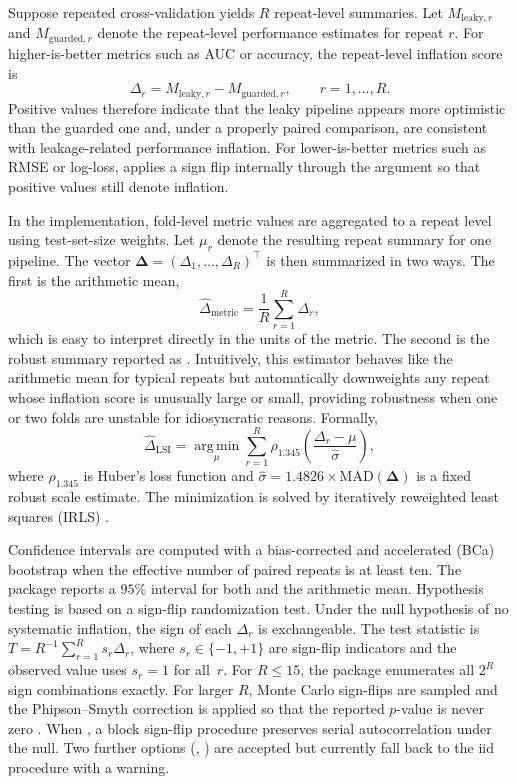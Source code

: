 \documentclass[article,shortnames]{jss}
\begin{document}
Suppose repeated cross-validation yields $R$ repeat-level summaries. Let
$M_{\mathrm{leaky},r}$ and $M_{\mathrm{guarded},r}$ denote the repeat-level
performance estimates for repeat $r$. For higher-is-better metrics such as AUC
or accuracy, the repeat-level inflation score is
\[
\Delta_r = M_{\mathrm{leaky},r} - M_{\mathrm{guarded},r}, \qquad r = 1, \ldots, R.
\]
Positive values therefore indicate that the leaky pipeline appears more optimistic than the guarded one and, under a properly paired comparison, are consistent with leakage-related performance inflation. For lower-is-better metrics such as RMSE or log-loss,  applies a sign flip internally through
the  argument so that positive values still denote
inflation.

In the implementation, fold-level metric values are aggregated to a repeat
level using test-set-size weights. Let $\mu_r$ denote the resulting repeat
summary for one pipeline. The vector
$\boldsymbol{\Delta} = (\Delta_1, \ldots, \Delta_R)^\top$ is then summarized in
two ways. The first is the arithmetic mean,
\[
\widehat{\Delta}_{\mathrm{metric}} =
\frac{1}{R} \sum_{r=1}^{R} \Delta_r,
\]
which is easy to interpret directly in the units of the metric. The second is
the robust summary reported as . Intuitively, this estimator
behaves like the arithmetic mean for typical repeats but automatically
downweights any repeat whose inflation score is unusually large or small,
providing robustness when one or two folds are unstable for idiosyncratic
reasons. Formally,
\[
\widehat{\Delta}_{\mathrm{LSI}} =
\operatorname*{arg\,min}_{\mu} \sum_{r=1}^{R}
\rho_{1.345} \left( \frac{\Delta_r - \mu}{\widehat{\sigma}} \right),
\]
where $\rho_{1.345}$ is Huber's loss function and
$\widehat{\sigma} = 1.4826 \times \mathrm{MAD}(\boldsymbol{\Delta})$ is a fixed
robust scale estimate. The minimization is solved by iteratively reweighted
least squares (IRLS) \citep{huber1964, huber2009}.

Confidence intervals are computed with a bias-corrected and accelerated (BCa)
bootstrap when the effective number of paired repeats is at least ten. The
package reports a $95\%$ interval for both  and the
arithmetic mean. Hypothesis testing is based on a sign-flip randomization test.
Under the null hypothesis of no systematic inflation, the sign of each
$\Delta_r$ is exchangeable. The test statistic is $T = R^{-1} \sum_{r=1}^{R}
s_r \Delta_r$, where $s_r \in \{-1, +1\}$ are sign-flip indicators and the
observed value uses $s_r = 1$ for all~$r$. For $R \leq 15$, the package
enumerates all $2^R$ sign combinations exactly. For larger $R$, Monte Carlo
sign-flips are
sampled and the Phipson--Smyth correction is applied so that the reported
$p$-value is never zero \citep{phipson2010}.
When , a block sign-flip procedure
preserves serial autocorrelation under the null. Two further options
(, ) are accepted but currently fall
back to the iid procedure with a warning.
\end{document}
